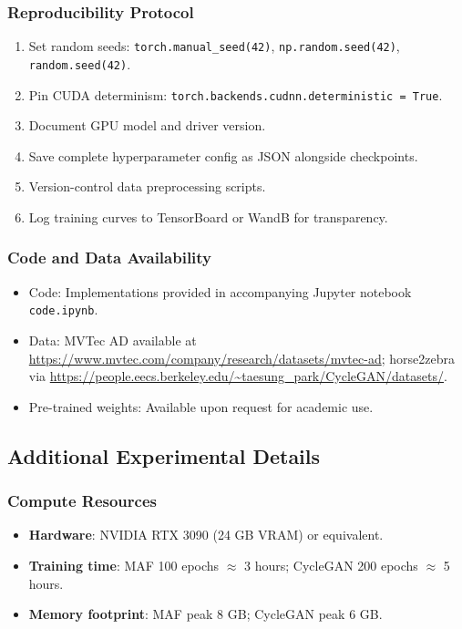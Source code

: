 \documentclass[11pt]{article}
\begin{document}
\subsubsection{Reproducibility Protocol}
\begin{enumerate}
\item Set random seeds: \texttt{torch.manual\_seed(42)}, \texttt{np.random.seed(42)}, \texttt{random.seed(42)}.
\item Pin CUDA determinism: \texttt{torch.backends.cudnn.deterministic = True}.
\item Document GPU model and driver version.
\item Save complete hyperparameter config as JSON alongside checkpoints.
\item Version-control data preprocessing scripts.
\item Log training curves to TensorBoard or WandB for transparency.
\end{enumerate}

\subsubsection{Code and Data Availability}
\begin{itemize}
\item Code: Implementations provided in accompanying Jupyter notebook \texttt{code.ipynb}.
\item Data: MVTec AD available at \url{https://www.mvtec.com/company/research/datasets/mvtec-ad}; horse2zebra via \url{https://people.eecs.berkeley.edu/~taesung_park/CycleGAN/datasets/}.
\item Pre-trained weights: Available upon request for academic use.
\end{itemize}

\subsection{Additional Experimental Details}
\subsubsection{Compute Resources}
\begin{itemize}
\item \textbf{Hardware}: NVIDIA RTX 3090 (24 GB VRAM) or equivalent.
\item \textbf{Training time}: MAF 100 epochs $\approx$ 3 hours; CycleGAN 200 epochs $\approx$ 5 hours.
\item \textbf{Memory footprint}: MAF peak 8 GB; CycleGAN peak 6 GB.
\end{itemize}
\end{document}
